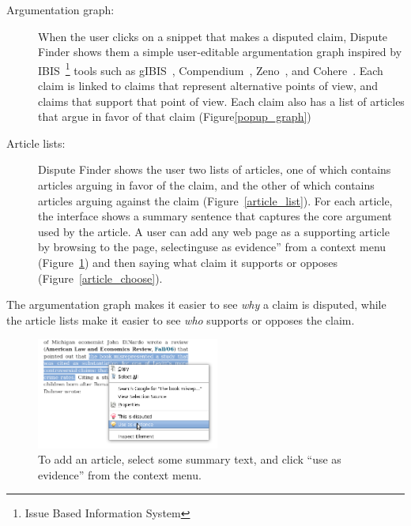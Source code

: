 \documentclass{www2010-submission}
\begin{document}
\begin{description}
\item[Argumentation graph:] When the user clicks on a snippet that makes a disputed claim, Dispute Finder shows them a simple user-editable argumentation graph inspired by IBIS~\footnote{Issue Based Information System} tools such as gIBIS~\cite{Conklin1987a}, Compendium~\cite{Selvin2001}, Zeno~\cite{Gordon1997}, and Cohere~\cite{Shum2008}. Each claim is linked to claims that represent alternative points of view, and claims that support that point of view. Each claim also has a list of articles that argue in favor of that claim (Figure\ref{popup_graph})

\item[Article lists:] Dispute Finder shows the user two lists of articles, one of which contains articles arguing in favor of the claim, and the other of which contains articles arguing against the claim (Figure~\ref{article_list}). For each article, the interface shows a summary sentence that captures the core argument used by the article. A user can add any web page as a supporting article by browsing to the page, selectinguse as evidence'' from a context menu (Figure~\ref{add_article}) and then saying what claim it supports or opposes (Figure~\ref{article_choose}).
\end{description}

The argumentation graph makes it easier to see {\it why} a claim is disputed, while the article lists make it easier to see {\it who} supports or opposes the claim. 

\begin{figure}[tb]
	\begin{center}
	\includegraphics[width=6cm]{pictures/mark_evidence.png}
	\caption{To add an article, select some summary text, and click ``use as evidence'' from the context menu.}
	\label{add_article}
	\end{center}
\end{figure}
\end{document}
